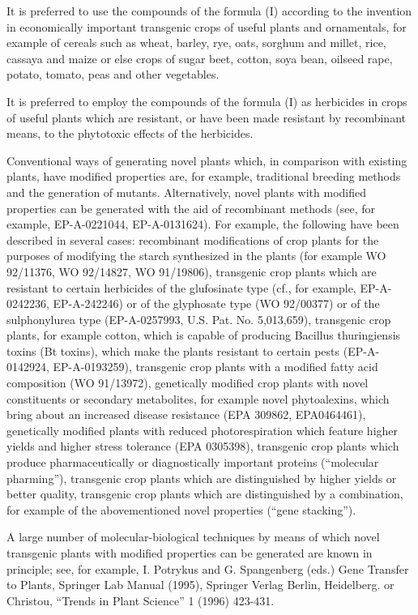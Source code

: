 \documentclass[11pt,a4paper]{article}
\begin{document}
It is preferred to use the compounds of the formula (I) according to the invention in economically important transgenic crops of useful plants and ornamentals, for example of cereals such as wheat, barley, rye, oats, sorghum and millet, rice, cassaya and maize or else crops of sugar beet, cotton, soya bean, oilseed rape, potato, tomato, peas and other vegetables.

It is preferred to employ the compounds of the formula (I) as herbicides in crops of useful plants which are resistant, or have been made resistant by recombinant means, to the phytotoxic effects of the herbicides.

Conventional ways of generating novel plants which, in comparison with existing plants, have modified properties are, for example, traditional breeding methods and the generation of mutants. Alternatively, novel plants with modified properties can be generated with the aid of recombinant methods (see, for example, EP-A-0221044, EP-A-0131624). For example, the following have been described in several cases: recombinant modifications of crop plants for the purposes of modifying the starch synthesized in the plants (for example WO 92/11376, WO 92/14827, WO 91/19806), transgenic crop plants which are resistant to certain herbicides of the glufosinate type (cf., for example, EP-A-0242236, EP-A-242246) or of the glyphosate type (WO 92/00377) or of the sulphonylurea type (EP-A-0257993, U.S. Pat. No. 5,013,659), transgenic crop plants, for example cotton, which is capable of producing Bacillus thuringiensis toxins (Bt toxins), which make the plants resistant to certain pests (EP-A-0142924, EP-A-0193259), transgenic crop plants with a modified fatty acid composition (WO 91/13972), genetically modified crop plants with novel constituents or secondary metabolites, for example novel phytoalexins, which bring about an increased disease resistance (EPA 309862, EPA0464461), genetically modified plants with reduced photorespiration which feature higher yields and higher stress tolerance (EPA 0305398), transgenic crop plants which produce pharmaceutically or diagnostically important proteins (“molecular pharming”), transgenic crop plants which are distinguished by higher yields or better quality, transgenic crop plants which are distinguished by a combination, for example of the abovementioned novel properties (“gene stacking”).

A large number of molecular-biological techniques by means of which novel transgenic plants with modified properties can be generated are known in principle; see, for example, I. Potrykus and G. Spangenberg (eds.) Gene Transfer to Plants, Springer Lab Manual (1995), Springer Verlag Berlin, Heidelberg. or Christou, “Trends in Plant Science” 1 (1996) 423-431.
\end{document}
